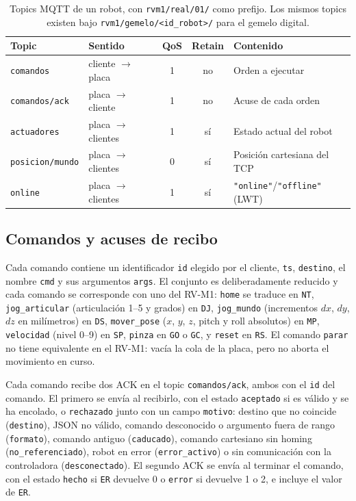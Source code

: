 \begin{table}[t]
  \centering
  \caption{Topics MQTT de un robot, con \texttt{rvm1/real/01/} como prefijo. Los mismos topics existen bajo \texttt{rvm1/gemelo/<id\_robot>/} para el gemelo digital.}
  \label{tab:topics}
  \small
  \begin{tabular}{@{}llccl@{}}
    \toprule
    Topic & Sentido & QoS & Retain & Contenido \\
    \midrule
    \texttt{comandos}         & cliente $\rightarrow$ placa  & 1 & no & Orden a ejecutar \\
    \texttt{comandos/ack}     & placa $\rightarrow$ cliente  & 1 & no & Acuse de cada orden \\
    \texttt{actuadores}       & placa $\rightarrow$ clientes & 1 & sí & Estado actual del robot \\
    \texttt{posicion/mundo}   & placa $\rightarrow$ clientes & 0 & sí & Posición cartesiana del TCP \\
    \texttt{online}           & placa $\rightarrow$ clientes & 1 & sí & \texttt{"online"}/\texttt{"offline"} (LWT) \\
    \bottomrule
  \end{tabular}
\end{table}

\subsection{Comandos y acuses de recibo}

Cada comando contiene un identificador \texttt{id} elegido por el cliente, \texttt{ts}, \texttt{destino}, el nombre \texttt{cmd} y sus argumentos \texttt{args}. El conjunto es deliberadamente reducido y cada comando se corresponde con uno del RV-M1: \texttt{home} se traduce en \texttt{NT}, \texttt{jog\_articular} (articulación 1--5 y grados) en \texttt{DJ}, \texttt{jog\_mundo} (incrementos $dx$, $dy$, $dz$ en milímetros) en \texttt{DS}, \texttt{mover\_pose} ($x$, $y$, $z$, pitch y roll absolutos) en \texttt{MP}, \texttt{velocidad} (nivel 0--9) en \texttt{SP}, \texttt{pinza} en \texttt{GO} o \texttt{GC}, y \texttt{reset} en \texttt{RS}. El comando \texttt{parar} no tiene equivalente en el RV-M1: vacía la cola de la placa, pero no aborta el movimiento en curso.

Cada comando recibe dos ACK en el topic \texttt{comandos/ack}, ambos con el \texttt{id} del comando. El primero se envía al recibirlo, con el estado \texttt{aceptado} si es válido y se ha encolado, o \texttt{rechazado} junto con un campo \texttt{motivo}: destino que no coincide (\texttt{destino}), JSON no válido, comando desconocido o argumento fuera de rango (\texttt{formato}), comando antiguo (\texttt{caducado}), comando cartesiano sin homing (\texttt{no\_referenciado}), robot en error (\texttt{error\_activo}) o sin comunicación con la controladora (\texttt{desconectado}). El segundo ACK se envía al terminar el comando, con el estado \texttt{hecho} si \texttt{ER} devuelve 0 o \texttt{error} si devuelve 1 o 2, e incluye el valor de \texttt{ER}.

